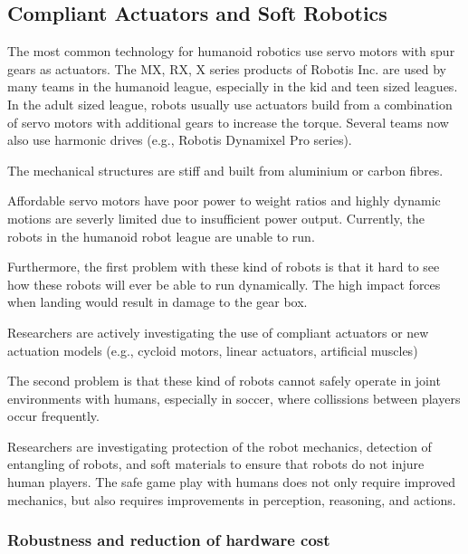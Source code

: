 \documentclass{article}
\begin{document}
\subsection{Compliant Actuators and Soft Robotics}

The most common technology for humanoid robotics use servo motors with spur gears as actuators.
The MX, RX, X series products of Robotis Inc. are used by many teams in the humanoid league, especially in the kid and teen sized leagues.
In the adult sized league, robots usually use actuators build from a combination of servo motors with additional gears to increase the torque.
Several teams now also use harmonic drives (e.g., Robotis Dynamixel Pro series).

The mechanical structures are stiff and built from aluminium or carbon fibres.

Affordable servo motors have poor power to weight ratios and highly dynamic motions are severly limited due to insufficient power output.
Currently, the robots in the humanoid robot league are unable to run.

Furthermore, the first problem with these kind of robots is that it hard to see how these robots will ever be able to run dynamically.
The high impact forces when landing would result in damage to the gear box.

Researchers are actively investigating the use of compliant actuators or new actuation models (e.g., cycloid motors, linear actuators, artificial muscles)

The second problem is that these kind of robots cannot safely operate in joint environments with humans, especially in soccer, where collissions between players occur frequently.

Researchers are investigating protection of the robot mechanics, detection of entangling of robots, and soft materials to ensure that robots do not injure human players.
The safe game play with humans does not only require improved mechanics, but also requires improvements in perception, reasoning, and actions.

\subsubsection{Robustness and reduction of hardware cost}

\end{document}
